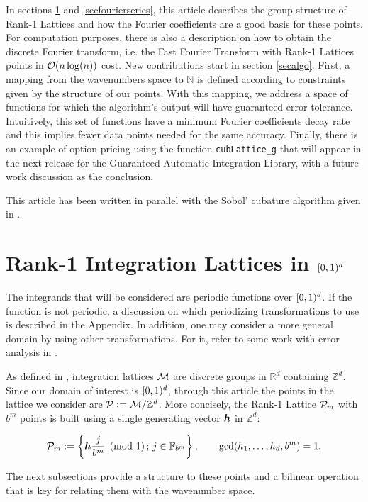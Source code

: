 \documentclass[graybox]{svmult}
\newcommand{\Z}{\mathbb{Z}} %
\newcommand{\R}{\mathbb{R}} %
\newcommand{\N}{\mathbb{N}} %
\newcommand{\F}{\mathbb{F}} %
\begin{document}
In sections \ref{secrank1lat} and \ref{secfourierseries}, this article describes the group structure of Rank-1 Lattices and how the Fourier coefficients are a good basis for these points. For computation purposes, there is also a description on how to obtain the discrete Fourier transform, i.e. the Fast Fourier Transform with Rank-1 Lattices points in $\mathcal{O}(n\log(n))$ cost. New contributions start in section \ref{secalgo}. First, a mapping from the wavenumbers space to $\N$ is defined according to constraints given by the structure of our points. With this mapping, we address a space of functions for which the algorithm's output will have guaranteed error tolerance. Intuitively, this set of functions have a minimum Fourier coefficients decay rate and this implies fewer data points needed for the same accuracy. Finally, there is an example of option pricing using the function \texttt{cubLattice\_g} that will appear in the next release for the Guaranteed Automatic Integration Library, \cite{ChoEtal14a} with a future work discussion as the conclusion.

This article has been written in parallel with the Sobol' cubature algorithm given in \cite{HicJim16a}.

\section{Rank-1 Integration Lattices in $[0,1)^d$}\label{secrank1lat}
The integrands that will be considered are periodic functions over $[0,1)^d$. If the function is not periodic, a discussion on which periodizing transformations to use is described in the Appendix. In addition, one may consider a more general domain by using other transformations. For it, refer to some work with error analysis in \cite{HicSloWas03a,HicSloWas03e}.

As defined in \cite[Sec. 2.7-2.8]{SloJoe94}, integration lattices $\mathcal{M}$ are discrete groups in $\R^d$ containing $\Z^d$. Since our domain of interest is $[0,1)^d$, through this article the points in the lattice we consider are $\cp:=\cm/\Z^d$. More concisely, the Rank-1 Lattice $\mathcal{P}_m$ with $b^m$ points is built using a single generating vector $\boldsymbol{h}$ in $\Z^d$:

\begin{equation}\label{latdef}
\cp_m :=\left\{\bsh\frac{j}{b^m}\pmod 1\, ;\, j\in\F_{b^m}\right\},\qquad \gcd(h_1,\dots,h_d,b^m)=1.
\end{equation}

The next subsections provide a structure to these points and a bilinear operation that is key for relating them with the wavenumber space.
\end{document}
